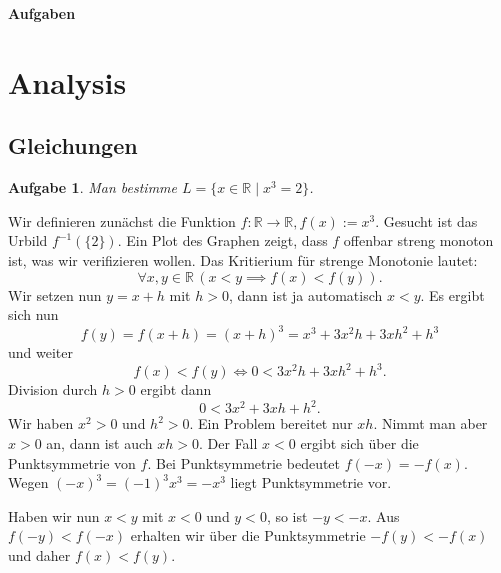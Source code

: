 \documentclass[a4paper,10pt,fleqn,twoside]{scrartcl}
\numberwithin{equation}{section}
\newcommand{\R}{\mathbb R}
\newcommand{\strong}[1]{{\normalfont\sffamily\bfseries #1}}
\theoremstyle{Aufgabe}
\newtheorem{Aufgabe}{\sffamily Aufgabe}[section]
\begin{document}
\setlength{\baselineskip}{14pt} 
\thispagestyle{empty}


\noindent
{\huge\normalfont\sffamily\bfseries Aufgaben}

\tableofcontents

\newpage
\section{Analysis}
\subsection{Gleichungen}
\begin{Aufgabe}
Man bestimme $L=\{x\in\R\mid x^3=2\}$.
\end{Aufgabe}

\noindent\strong{Lösung.}
Wir definieren zunächst die Funktion $f\colon\R\to\R, f(x):=x^3$.
Gesucht ist das Urbild $f^{-1}(\{2\})$.
Ein Plot des Graphen zeigt, dass $f$ offenbar streng monoton ist, was
wir verifizieren wollen. Das Kritierium für strenge Monotonie lautet:
\begin{equation}
\forall x,y\in\R\,(x<y\implies f(x)<f(y)).
\end{equation}
Wir setzen nun $y=x+h$ mit $h>0$, dann ist ja automatisch $x<y$.
Es ergibt sich nun
\begin{equation}
f(y) = f(x+h) = (x+h)^3 = x^3+3x^2h+3xh^2+h^3
\end{equation}
und weiter
\begin{equation}
f(x)<f(y) \iff 0 < 3x^2 h+3xh^2+h^3.
\end{equation}
Division durch $h>0$ ergibt dann
\begin{equation}
0 < 3x^2+3xh+h^2.
\end{equation}
Wir haben $x^2>0$ und $h^2>0$. Ein Problem bereitet nur $xh$. Nimmt man
aber $x>0$ an, dann ist auch $xh>0$. Der Fall $x<0$ ergibt sich
über die Punktsymmetrie von $f$. Bei Punktsymmetrie bedeutet $f(-x)=-f(x)$.
Wegen $(-x)^3=(-1)^3x^3=-x^3$ liegt Punktsymmetrie vor.

Haben wir nun $x<y$ mit $x<0$ und $y<0$, so ist $-y<-x$. Aus
$f(-y)<f(-x)$ erhalten wir über die Punktsymmetrie $-f(y)<-f(x)$
und daher $f(x)<f(y)$.
\end{document}
